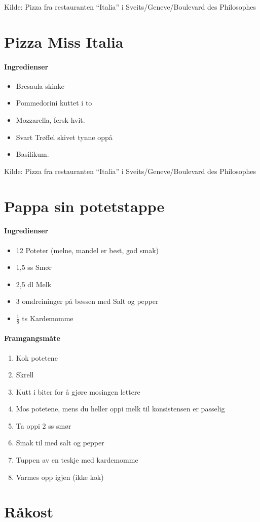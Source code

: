 \documentclass[12pt,a4paper]{book}
\begin{document}
{Kilde: Pizza fra restauranten “Italia” i Sveits/Geneve/Boulevard des Philosophes
\clearpage{}
\clearpage{}\section{﻿Pizza Miss Italia}


\paragraph{Ingredienser}
\begin{itemize}[noitemsep]
	\item Bresaula skinke
	\item Pommedorini kuttet i to
	\item Mozzarella, fersk hvit.
	\item Svart Trøffel skivet tynne oppå
	\item Basilikum.
\end{itemize}




Kilde: Pizza fra restauranten “Italia” i Sveits/Geneve/Boulevard des Philosophes
\clearpage{}
\clearpage{}\section{﻿Pappa sin potetstappe}


\paragraph{Ingredienser}
\begin{itemize}[noitemsep]
	\item 12 Poteter (melne, mandel er best, god smak)
	\item 1,5 ss Smør
	\item 2,5 dl Melk
	\item 3 omdreininger på bøssen med Salt og pepper
	\item $\frac{1}{8}$ ts Kardemomme
\end{itemize}

\paragraph{Framgangsmåte}
\begin{enumerate}[noitemsep]
	\item Kok potetene
	\item Skrell
	\item Kutt i biter for å gjøre mosingen lettere
	\item Mos potetene, mens du heller oppi melk til konsistensen er passelig
	\item Ta oppi 2 ss smør
	\item Smak til med salt og pepper
	\item Tuppen av en teskje med kardemomme
	\item Varmes opp igjen (ikke kok)
\end{enumerate}
\clearpage{}
\clearpage{}\section{﻿Råkost}


}
\end{document}
